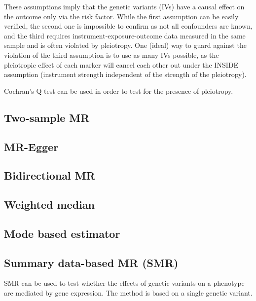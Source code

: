 \documentclass[
]{book}
\begin{document}
These assumptions imply that the genetic variants (IVs) have a causal effect on the outcome only via the risk factor. While the first assumption can be easily verified, the second one is impossible to confirm as not all confounders are known, and the third requires instrument-exposure-outcome data measured in the same sample and is often violated by pleiotropy. One (ideal) way to guard against the violation of the third assumption is to use as many IVs possible, as the pleiotropic effect of each marker will cancel each other out under the INSIDE assumption (instrument strength independent of the strength of the pleiotropy).

Cochran's Q test can be used in order to test for the presence of pleiotropy.

\hypertarget{two-sample-mr}{%
\subsection{Two-sample MR}\label{two-sample-mr}}

\hypertarget{mr-egger}{%
\subsection{MR-Egger}\label{mr-egger}}

\hypertarget{bidirectional-mr}{%
\subsection{Bidirectional MR}\label{bidirectional-mr}}

\hypertarget{weighted-median}{%
\subsection{Weighted median}\label{weighted-median}}

\hypertarget{mode-based-estimator}{%
\subsection{Mode based estimator}\label{mode-based-estimator}}

\hypertarget{summary-data-based-mr-smr}{%
\subsection{Summary data-based MR (SMR)}\label{summary-data-based-mr-smr}}

SMR can be used to test whether the effects of genetic variants on a phenotype are mediated by gene expression. The method is based on a single genetic variant.
\end{document}
